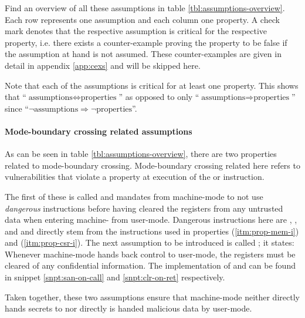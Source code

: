 Find an overview of all these assumptions in table \ref{tbl:assumptions-overview}.
Each row represents one assumption and each column one property.
A check mark denotes that the respective assumption is critical for the respective property, i.e. there exists a counter-example proving the property to be false if the assumption at hand is not assumed.
These counter-examples are given in detail in appendix \ref{app:cexs} and will be skipped here.

Note that each of the assumptions is critical for at least one property.
This shows that \enquote{$ \text{assumptions} \Leftrightarrow \text{properties} $} as opposed to only \enquote{$ \text{assumptions} \Rightarrow \text{properties} $} since \enquote{$ \neg \text{assumptions} \Rightarrow \neg \text{properties} $}.

\paragraph{Mode-boundary crossing related assumptions}
As can be seen in table \ref{tbl:assumptions-overview}, there are two properties related to mode-boundary crossing.
Mode-boundary crossing related here refers to vulnerabilities that violate a property at execution of the  or  instruction.

The first of these is called  and mandates from machine-mode to not use \textit{dangerous} instructions before having cleared the registers from any untrusted data when entering machine- from user-mode.
Dangerous instructions here are , ,  and  and directly stem from the instructions used in properties  (\ref{itm:prop-mem-i}) and  (\ref{itm:prop-csr-i}).
The next assumption to be introduced is called ; it states: Whenever machine-mode hands back control to user-mode, the registers must be cleared of any confidential information.
The implementation of  and  can be found in snippet \ref{snpt:san-on-call} and \ref{snpt:clr-on-ret} respectively.

Taken together, these two assumptions ensure that machine-mode neither directly hands secrets to nor directly is handed malicious data by user-mode.

